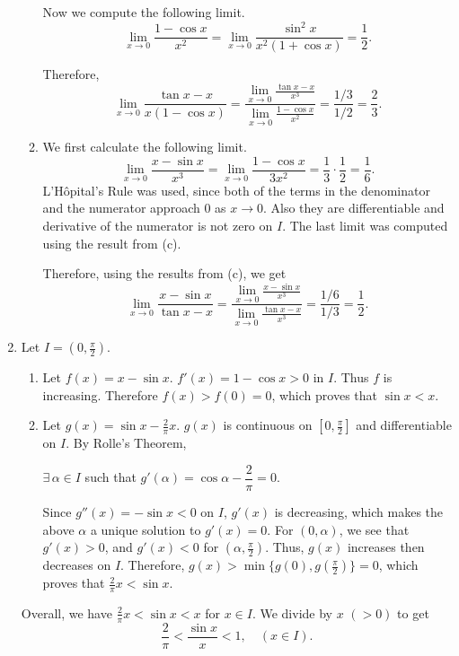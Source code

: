 \documentclass[12pt]{report}
\newcommand{\numl}[1]{\item[\large\textbf{\sffamily #1.}]}
\newcommand{\num}[1]{\item[\textbf{\sffamily #1}]}
\newcommand{\ds}{\displaystyle}
\newcommand{\ra}{\rightarrow}
\let\oldexists\exists
\renewcommand{\exists}{\oldexists\,}
\begin{document}
\begin{enumerate}
\begin{enumerate}
        Now we compute the following limit.
        \[
            \lim_{x \ra 0} \frac{1 - \cos x}{x^2} = \lim_{x \ra 0} \frac{\sin^2 x}{x^2 (1 + \cos x)} = \frac{1}{2}.
        \]

        Therefore,
        \[
            \lim_{x \ra 0} \frac{\tan x - x}{x(1-\cos x)} = \frac{\ds \lim_{x \ra 0} \frac{\tan x - x}{x^3}}{\ds \lim_{x \ra 0} \frac{1-\cos x}{x^2}} = \frac{1/3}{1/2} = \frac{2}{3}.
        \]

        \num{(d)} We first calculate the following limit.
        \[
            \lim_{x \ra 0} \frac{x - \sin x}{x^3} = \lim_{x \ra 0} \frac{1 - \cos x}{3x^2} = \frac{1}{3}\cdot \frac{1}{2} = \frac{1}{6}.
        \]
        L'H\^opital's Rule was used, since both of the terms in the denominator and the numerator approach \(0\) as \(x \ra 0\). Also they are differentiable and derivative of the numerator is not zero on \(I\). The last limit was computed using the result from {\sffamily (c)}.

        Therefore, using the results from {\sffamily (c)}, we get
        \[
            \lim_{x \ra 0} \frac{x - \sin x}{\tan x - x} = \frac{\ds \lim_{x\ra 0} \frac{x - \sin x}{x^3}}{\ds \lim_{x \ra 0} \frac{\tan x -x}{x^3}} = \frac{1/6}{1/3} = \frac{1}{2}.
        \]
    \end{enumerate}

    \numl{5} Let \(I = (0, \frac{\pi}{2})\).
    \begin{enumerate}
        \num{(i)} Let \(f(x) = x - \sin x\). \(f'(x) = 1-\cos x > 0\) in \(I\). Thus \(f\) is increasing. Therefore \(f(x) > f(0) = 0\), which proves that \(\sin x < x\).

        \num{(ii)} Let \(g(x) = \sin x - \frac{2}{\pi}x\). \(g(x)\) is continuous on \([0, \frac{\pi}{2}]\) and differentiable on \(I\). By Rolle's Theorem,
        \begin{center}
            \(\exists \alpha \in I\) such that \(g'(\alpha) = \cos \alpha - \dfrac{2}{\pi} = 0\).
        \end{center}
        Since \(g''(x) = -\sin x < 0\) on \(I\), \(g'(x)\) is decreasing, which makes the above \(\alpha\) a unique solution to \(g'(x) = 0\). For \((0, \alpha)\), we see that \(g'(x) > 0\), and \(g'(x) < 0\) for \((\alpha, \frac{\pi}{2})\). Thus, \(g(x)\) increases then decreases on \(I\). Therefore, \(g(x) > \min\{g(0), g\left(\frac{\pi}{2}\right)\} = 0\), which proves that \(\frac{2}{\pi} x < \sin x\).
    \end{enumerate}
    Overall, we have \(\frac{2}{\pi} x < \sin x < x\) for \(x \in I\). We divide by \(x\) \((> 0)\) to get
    \[
        \frac{2}{\pi} < \frac{\sin x}{x} < 1, \quad (x \in I).
    \]


\end{enumerate}
\end{document}
